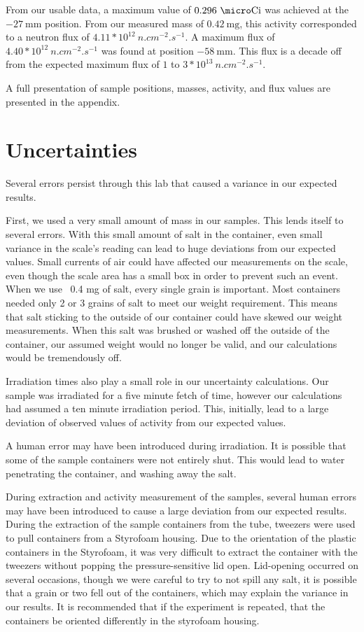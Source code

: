 From our usable data, a maximum value of $0.296\ \micro\text{Ci}$ was achieved at the $-27\ \text{mm}$ position. From our measured mass of $0.42\ \text{mg}$, this activity corresponded to a neutron flux of $4.11 * 10^{12}\ n.cm^{-2}.s^{-1}$. A maximum flux of $4.40 * 10^{12}\ n.cm^{-2}.s^{-1}$ was found at position $-58\ \text{mm}$. This flux is a decade off from the expected maximum flux of $1$ to $3 * 10^{13}\ n.cm^{-2}.s^{-1}$.

A full presentation of sample positions, masses, activity, and flux values are presented in the appendix.

\section{Uncertainties}

Several errors persist through this lab that caused a variance in our expected results. 

First, we used a very small amount of mass in our samples. This lends itself to several errors. With this small amount of salt in the container, even small variance in the scale’s reading can lead to huge deviations from our expected values. Small currents of air could have affected our measurements on the scale, even though the scale area has a small box in order to prevent such an event. When we use ~0.4 mg of salt, every single grain is important. Most containers needed only 2 or 3 grains of salt to meet our weight requirement. This means that salt sticking to the outside of our container could have skewed our weight measurements. When this salt was brushed or washed off the outside of the container, our assumed weight would no longer be valid, and our calculations would be tremendously off. 

Irradiation times also play a small role in our uncertainty calculations. Our sample was irradiated for a five minute fetch of time, however our calculations had assumed a ten minute irradiation period. This, initially, lead to a large deviation of observed values of activity from our expected values. 

A human error may have been introduced during irradiation. It is possible that some of the sample containers were not entirely shut. This would lead to water penetrating the container, and washing away the salt. 

During extraction and activity measurement of the samples, several human errors may have been introduced to cause a large deviation from our expected results. During the extraction of the sample containers from the tube, tweezers were used to pull containers from a Styrofoam housing. Due to the orientation of the plastic containers in the Styrofoam, it was very difficult to extract the container with the tweezers without popping the pressure-sensitive lid open. Lid-opening occurred on several occasions, though we were careful to try to not spill any salt, it is possible that a grain or two fell out of the containers, which may explain the variance in our results. It is recommended that if the experiment is repeated, that the containers be oriented differently in the styrofoam housing. 

